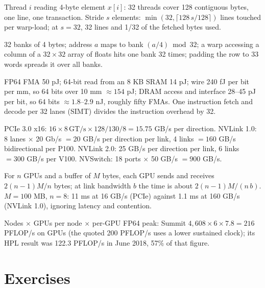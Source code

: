 \documentclass[11pt,letterpaper]{article}
\begin{document}
\begin{description}[leftmargin=0pt,labelindent=0pt,itemsep=6pt,font=\normalfont\bfseries\sffamily]
\item[Coalescing.] Thread $i$ reading 4-byte element $x[i]$: 32 threads cover 128 contiguous bytes, one line, one transaction. Stride $s$ elements: $\min(32, \lceil 128\,s/128\rceil)$ lines touched per warp-load; at $s = 32$, 32 lines and 1/32 of the fetched bytes used.
\item[Shared-memory bank conflicts.] 32 banks of 4 bytes; address $a$ maps to bank $(a/4) \bmod 32$; a warp accessing a column of a $32\times 32$ array of floats hits one bank 32 times; padding the row to 33 words spreads it over all banks.
\item[Energy per operation (Keckler et al.\ 2011, 40 nm).] FP64 FMA 50 pJ; 64-bit read from an 8 KB SRAM 14 pJ; wire 240 fJ per bit per mm, so 64 bits over 10 mm $\approx 154$ pJ; DRAM access and interface 28--45 pJ per bit, so 64 bits $\approx 1.8$--$2.9$ nJ, roughly fifty FMAs. One instruction fetch and decode per 32 lanes (SIMT) divides the instruction overhead by 32.
\item[Interconnect.] PCIe 3.0 x16: $16\times 8\,\mathrm{GT/s}\times 128/130 / 8 = 15.75$ GB/s per direction. NVLink 1.0: 8 lanes $\times$ 20 Gb/s $= 20$ GB/s per direction per link, 4 links $= 160$ GB/s bidirectional per P100. NVLink 2.0: 25 GB/s per direction per link, 6 links $= 300$ GB/s per V100. NVSwitch: 18 ports $\times$ 50 GB/s $= 900$ GB/s.
\item[Ring all-reduce time (order of magnitude).] For $n$ GPUs and a buffer of $M$ bytes, each GPU sends and receives $2(n-1)M/n$ bytes; at link bandwidth $b$ the time is about $2(n-1)M/(n\,b)$. $M = 100$ MB, $n = 8$: 11 ms at 16 GB/s (PCIe) against 1.1 ms at 160 GB/s (NVLink 1.0), ignoring latency and contention.
\item[Supercomputer peak.] Nodes $\times$ GPUs per node $\times$ per-GPU FP64 peak: Summit $4{,}608\times 6\times 7.8 = 216$ PFLOP/s on GPUs (the quoted 200 PFLOP/s uses a lower sustained clock); its HPL result was 122.3 PFLOP/s in June 2018, 57\% of that figure.
\end{description}

\clearpage
\section{Exercises}
\end{document}
